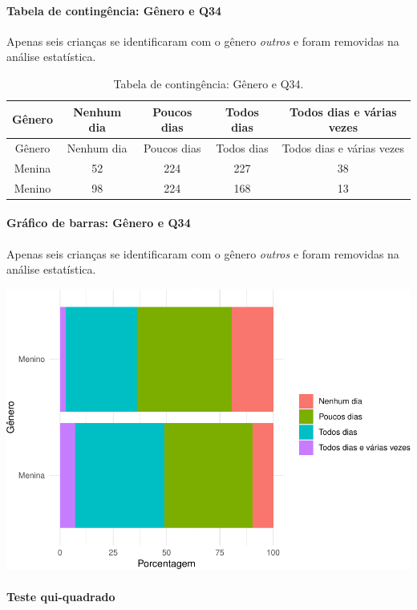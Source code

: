 \documentclass[]{article}
\let\oldparagraph\paragraph
\renewcommand{\paragraph}[1]{\oldparagraph{#1}\mbox{}}
\begin{document}
\cleardoublepage

\hypertarget{tabela-de-continguxeancia-guxeanero-e-q34}{%
\paragraph{Tabela de contingência: Gênero e Q34}\label{tabela-de-continguxeancia-guxeanero-e-q34}}

Apenas seis crianças se identificaram com o gênero \emph{outros} e foram removidas na análise estatística.

\begin{longtable}[]{@{}ccccc@{}}
\caption{\label{tab:unnamed-chunk-1203}Tabela de contingência: Gênero e Q34.}\tabularnewline
\toprule
Gênero & Nenhum dia & Poucos dias & Todos dias & Todos dias e várias vezes\tabularnewline
\midrule
\endfirsthead
\toprule
Gênero & Nenhum dia & Poucos dias & Todos dias & Todos dias e várias vezes\tabularnewline
\midrule
\endhead
Menina & 52 & 224 & 227 & 38\tabularnewline
Menino & 98 & 224 & 168 & 13\tabularnewline
\bottomrule
\end{longtable}

\hypertarget{gruxe1fico-de-barras-guxeanero-e-q34}{%
\paragraph{Gráfico de barras: Gênero e Q34}\label{gruxe1fico-de-barras-guxeanero-e-q34}}

Apenas seis crianças se identificaram com o gênero \emph{outros} e foram removidas na análise estatística.

\begin{center}\includegraphics[width=0.75\linewidth]{relatorio_covid19_files/figure-latex/unnamed-chunk-1204-1} \end{center}

\hypertarget{teste-qui-quadrado-103}{%
\paragraph{Teste qui-quadrado}\label{teste-qui-quadrado-103}}
\end{document}
